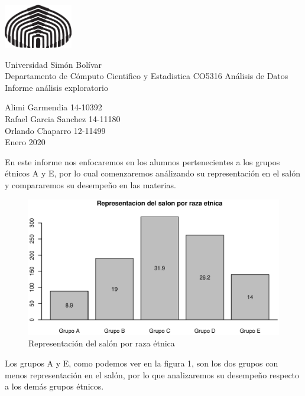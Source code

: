 \documentclass{article}
\begin{document}
\parbox{3.3cm}{\includegraphics[width=3cm]{Images/usblogo.eps}}\parbox{8cm}{Universidad
   Sim\'on Bol\'ivar\\
   Departamento de C\'omputo Cientifico y Estadistica
   \hspace{1cm}CO5316 An\'alisis de Datos\\
   Informe an\'alisis exploratorio}\parbox{17cm}{ \hspace{1cm}Alimi Garmendia 14-10392\\
  \hspace*{1cm}Rafael Garcia Sanchez 14-11180 \\
  \hspace*{1cm}Orlando Chaparro 12-11499 \\
   \hspace*{1cm}Enero 2020}
   \vspace{1cm}

    En este informe nos enfocaremos en los alumnos pertenecientes a los grupos \'etnicos A y E, por lo cual comenzaremos an\'alizando
    su representaci\'on en el sal\'on y compararemos su desempe\~no en las materias.
    

    \begin{figure}[h]
        \includegraphics[scale = 0.8]{Output/Plots/1_Representaciondelsalonporrazaetnica.eps}
        \caption{Representaci\'on del sal\'on por raza \'etnica}
        \label{fig:minipage1}
    \end{figure}

    Los grupos A y E, como podemos ver en la figura 1, son los dos grupos con menos representaci\'on en el sal\'on, por lo
    que analizaremos su desempe\~no respecto a los dem\'as grupos \'etnicos.
\end{document}
